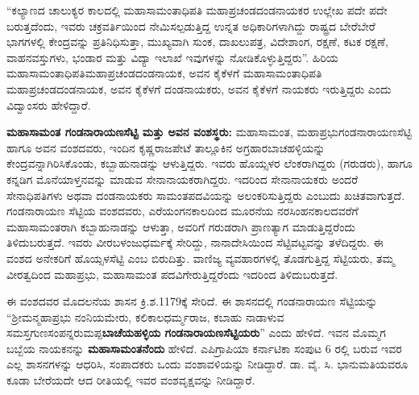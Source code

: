 “ಕಲ್ಯಾಣದ ಚಾಲುಕ್ಯರ ಕಾಲದಲ್ಲಿ ಮಹಾಸಾಮಂತಾಧಿಪತಿ ಮಹಾಪ್ರಚಂಡದಂಡನಾಯಕರ ಉಲ್ಲೇಖ ಪದೇ ಪದೇ ಬರುತ್ತದೆಂದು, ಇವರು ಚಕ್ರವರ್ತಿಯಿಂದ ನೇಮಿಸಲ್ಪಡುತ್ತಿದ್ದ ಉನ್ನತ ಅಧಿಕಾರಿಗಳಾಗಿದ್ದು ರಾಷ್ಟ್ರದ ಬೇರೆಬೇರೆ ಭಾಗಗಳಲ್ಲಿ ಕೇಂದ್ರವನ್ನು ಪ್ರತಿನಿಧಿಸುತ್ತಾ, ಮುಖ್ಯವಾಗಿ ಸುಂಕ, ದಾಖಲುಪತ್ರ, ವಿದೇಶಾಂಗ, ರಕ್ಷಣೆ, ಕಟಕ ರಕ್ಷಣೆ, ವಾಹನವಸ್ತುಗಳು, ಭಂಡಾರ ಮತ್ತು ವಿದ್ಯಾ ಇಲಾಖೆ ಇವುಗಳನ್ನು ನೋಡಿಕೊಳ್ಳುತ್ತಿದ್ದರು”. ಹಿರಿಯ ಮಹಾಸಾಮಂತಾಧಿಪತಿ\break ಮಹಾಪ್ರಚಂಡದಂಡನಾಯಕ, ಅವನ ಕೈಕೆಳಗೆ ಮಹಾಸಾಮಂತಾಧಿಪತಿ ಮಹಾಪ್ರಚಂಡದಂಡನಾಯಕ, ಅವನ ಕೈಕೆಳಗೆ ದಂಡನಾಯಕರು, ಅವನ ಕೈಕೆಳಗೆ ನಾಯಕರು ಇರುತ್ತಿದ್ದರು ಎಂದು ವಿದ್ವಾಂಸರು ಹೇಳಿದ್ದಾರೆ.

\textbf{ಮಹಾಸಾಮಂತ ಗಂಡನಾರಾಯಣಸೆಟ್ಟಿ ಮತ್ತು ಅವನ ವಂಶಸ್ಥರು:} ಮಹಾಸಾಮಂತ, ಮಹಾಪ್ರಭು\break ಗಂಡನಾರಾಯಣಸೆಟ್ಟಿ ಹಾಗೂ ಅವನ ವಂಶದವರು, ಇಂದಿನ ಕೃಷ್ಣರಾಜಪೇಟೆ ತಾಲ್ಲೂಕಿನ ಅಗ್ರಹಾರಬಾಚಹಳ್ಳಿಯನ್ನು ಕೇಂದ್ರವನ್ನಾಗಿರಿಸಿಕೊಂಡು, ಕಬ್ಬಾಹುನಾಡನ್ನು ಆಳುತ್ತಿದ್ದರು. ಇವರು ಹೊಯ್ಸಳರ ಲೆಂಕರಾಗಿದ್ದರು (ಗರುಡರು), ಹಾಗೂ ಕನ್ನಡಿಗ ಮೊನೆಯಾಳ್ತನವನ್ನು ಮಾಡುವ ಸೇನಾನಾಯಕರಾಗಿದ್ದರು. ಇದರಿಂದ ಸೇನಾನಾಯಕರು ಅಂದರೆ ಸೇನಾಧಿಪತಿಗಳು ಅಥವಾ ದಂಡನಾಯಕರು ಸಾಮಂತಪದವಿಯನ್ನು ಅಲಂಕರಿಸುತ್ತಿದ್ದರು ಎಂಬುದು ಖಚಿತವಾಗುತ್ತದೆ. ಗಂಡನಾರಾಯಣ ಸೆಟ್ಟಿಯ ವಂಶದವರು, ಎರೆಯಂಗನಕಾಲದಿಂದ ಮೂರನೆಯ ನರಸಿಂಹನಕಾಲದವರೆಗೆ ಮಹಾಸಾಮಂತರಾಗಿ ಕಬ್ಬಾಹುನಾಡನ್ನು ಆಳುತ್ತಾ, ಅವರಿಗೆ ಗರುಡರಾಗಿ ಪ್ರಾಣತ್ಯಾಗ ಮಾಡುತ್ತಿದ್ದರೆಂದು ತಿಳಿದುಬರುತ್ತದೆ. ಇವರು ವೀರಬಳಂಜುಧರ್ಮಕ್ಕೆ ಸೇರಿದ್ದು, ನಾನಾದೇಸಿಯಿಂದ ಸೆಟ್ಟಿವಟ್ಟವನ್ನು ತಳೆದಿದ್ದರು. ಈ ವಂಶದ ಅನೇಕರಿಗೆ ಹೊಯ್ಸಳಸೆಟ್ಟಿ ಎಂಬ ಬಿರುದಿತ್ತು. ವಾಣಿಜ್ಯ ವ್ಯವಹಾರಗಳಲ್ಲಿ ತೊಡಗುತ್ತಿದ್ದ ಸೆಟ್ಟಿಯರು, ತಮ್ಮ ವೀರತ್ವದಿಂದ ಮಹಾಪ್ರಭು, ಮಹಾಸಾಮಂತ ಪದವಿಗೇರುತ್ತಿದ್ದರೆಂದು ಇದರಿಂದ ತಿಳಿದುಬರುತ್ತದೆ.

ಈ ವಂಶದವರ ಮೊದಲನೆಯ ಶಾಸನ ಕ್ರಿ.ಶ.1179ಕ್ಕೆ ಸೇರಿದೆ. ಈ ಶಾಸನದಲ್ಲಿ ಗಂಡನಾರಾಯಣ ಸೆಟ್ಟಿಯನ್ನು “ಶ‍್ರೀಮನ್ಮಹಾಪ್ರಭು ನಂನಿಯಮೇರು, ಕಲಿಕಾಲಧರ್ಮ್ಮರಾಜ, ಕಬಾಹು ನಾಡಾಳುವ ಸಮಸ್ತಗುಣಸಂಪನ್ನರುಮಪ್ಪ\break \textbf{ಬಾಚೆಯಹಳ್ಳಿಯ ಗಂಡನಾರಾಯಣಸೆಟ್ಟಿಯರು}” ಎಂದು ಹೇಳಿದೆ. ಇವನ ಮೊಮ್ಮಗ ಬಬ್ಬೆಯ ನಾಯಕನನ್ನು \textbf{ಮಹಾಸಾಮಂತ\-ನೆಂದು} ಹೇಳಿದೆ. ಎಪಿಗ್ರಾಪಿಯಾ ಕರ್ನಾಟಿಕಾ ಸಂಪುಟ 6 ರಲ್ಲಿ ಬರುವ ಇವರ ಎಲ್ಲ ಶಾಸನಗಳನ್ನು ಆಧರಿಸಿ, ಸಂಪಾದಕರು ಒಂದು ವಂಶಾವಳಿಯನ್ನು ನೀಡಿದ್ದಾರೆ. ಡಾ. ವೈ. ಸಿ. ಭಾನುಮತಿಯವರೂ ಕೂಡಾ ಬೇರೆಯದೇ ಆದ ರೀತಿಯಲ್ಲಿ ಇವರ ವಂಶವೃಕ್ಷವನ್ನು ನೀಡಿದ್ದಾರೆ.

